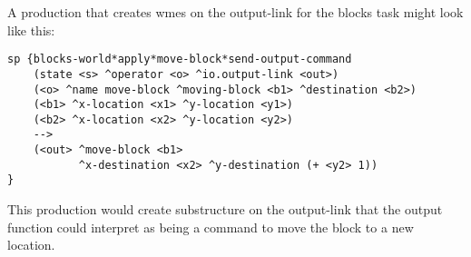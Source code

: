 A production that creates wmes on the output-link for the blocks task 
might look like this:

\begin{verbatim}
sp {blocks-world*apply*move-block*send-output-command
    (state <s> ^operator <o> ^io.output-link <out>)
    (<o> ^name move-block ^moving-block <b1> ^destination <b2>)
    (<b1> ^x-location <x1> ^y-location <y1>)
    (<b2> ^x-location <x2> ^y-location <y2>)
    -->
    (<out> ^move-block <b1>
           ^x-destination <x2> ^y-destination (+ <y2> 1))
}
\end{verbatim} \vspace{12pt}

This production would create substructure on the output-link that 
the output function could interpret as being a command to 
move the block to a new location.


